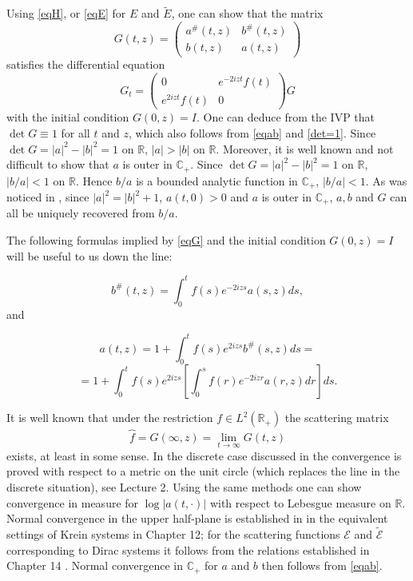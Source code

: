 \documentclass[11pt,twoside,reqno]{amsart}
\def\ti{\tilde}
\def\to{\rightarrow}
\def\R{{\mathbb R}}
\def\C{{\mathbb{C}}}
\def\EE{{\mathcal E}}
\theoremstyle{plain}
\numberwithin{equation}{section}
\begin{document}
Using \eqref{eqH}, or \eqref{eqE} for $E$ and $\ti E$, one can show that the matrix
$$G(t,z)=\begin{pmatrix}a^\#(t,z) & b^\#(t,z) \\  b(t,z) &  a(t,z)
\end{pmatrix}
$$
satisfies the differential equation
\begin{equation}
G_t=\begin{pmatrix}0 & e^{-2izt}f(t) \\ e^{2izt}f(t) & 0
\end{pmatrix}G
\label{eqG}\end{equation}
with the initial condition $G(0,z)=I$. One can deduce from the IVP that $\det G\equiv 1$ for all $t$ and $z$, which also follows
from \eqref{eqab} and \eqref{det=1}. 
Since $\det G=|a|^2-|b|^2=1$ on $\R$, $|a|>|b|$ on $\R$.
Moreover, it is well known and not difficult to show that $a$ is outer in $\C_+$.
Since $\det G=|a|^2-|b|^2=1$ on $\R$, $|b/a|<1$ on $\R$. Hence $b/a$ is a bounded analytic function in $\C_+$,
$|b/a|<1$.
As was noticed in \cite{TT}, since $|a|^2=|b|^2+1$,  $a(t,0)>0$ and $a$ is outer in $\C_+$, $a,b$ and $G$ can all be
uniquely recovered from $b/a$.

The following formulas implied by \eqref{eqG} and the initial condition $G(0,z)=I$ will be useful to us down the line:

\begin{equation*}
	b^\#(t,z)=\int_{0}^{t}f(s)e^{-2izs}a(s,z)ds,
\end{equation*}
and

	$$a(t,z)=1+\int_{0}^{t}f(s)e^{2izs}b^\#(s,z)ds= $$
\begin{equation}	
	=1+\int_{0}^{t}f(s)e^{2izs}\left[ \int_{0}^{s}f(r)e^{-2izr}a(r,z)dr\right]ds.\label{eqA}
\end{equation}


It is well known that under the restriction $f\in L^2(\R_+)$ the scattering matrix
$$\overbrace{f}=G(\infty, z)=\lim_{t\to\infty} G(t,z)$$
exists, at least in some sense. In the discrete case discussed in \cite{TT} the convergence is proved with respect to a metric on the unit circle (which replaces
the line in the discrete situation), see Lecture 2. Using the same methods one can show convergence in measure for $\log |a(t,\cdot)|$ with respect
to Lebesgue measure on $\R$.
Normal convergence in the upper half-plane is established in \cite{Den} in the equivalent settings of Krein systems in Chapter 12; for the scattering functions $\EE$ and $\ti\EE$ corresponding to Dirac systems it follows from the relations established in Chapter 14 \cite{Den}. Normal convergence in $\C_+$ for $a$ and $b$ then follows from \eqref{eqab}.
\end{document}

